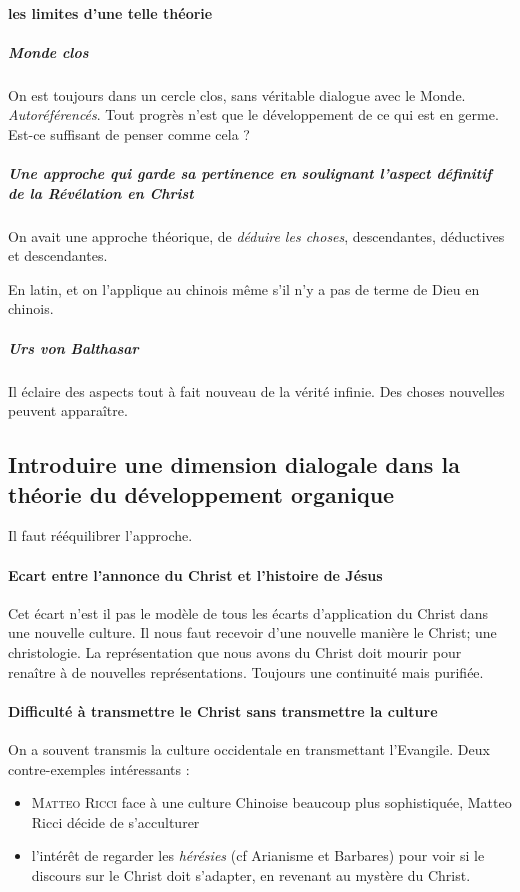     
      
      \paragraph{les limites d'une telle théorie}
      
    \subparagraph{Monde clos}      On est toujours dans un cercle clos, sans véritable dialogue avec le Monde. \textit{Autoréférencés}. Tout progrès n'est que le développement de ce qui est en germe. Est-ce suffisant de penser comme cela ?
    
    \subparagraph{Une approche qui garde sa pertinence en soulignant l'aspect définitif de la Révélation en Christ} On avait une approche théorique, de \textit{déduire les choses}, descendantes, déductives et descendantes. 
    \begin{Ex}
      En latin, et on l'applique au chinois même s'il n'y a pas de terme de Dieu en chinois.
  
    \end{Ex} 
    
    
    \subparagraph{Urs von Balthasar} Il éclaire des aspects tout à fait nouveau de la vérité infinie. Des choses nouvelles peuvent apparaître. 
    
    
    \subsection{Introduire une dimension dialogale dans la théorie du
    développement organique}
    
    Il faut rééquilibrer l'approche.
    \paragraph{Ecart entre l'annonce du Christ et l'histoire de Jésus} Cet écart n'est il pas le modèle de tous les écarts d'application du Christ dans une nouvelle culture. 
    Il nous faut recevoir d'une nouvelle manière le Christ; une christologie. 
    La représentation que nous avons du Christ doit mourir pour renaître à de nouvelles représentations. Toujours une continuité mais purifiée. 
  
  \paragraph{Difficulté à transmettre le Christ sans transmettre la culture} On a souvent transmis la culture occidentale en transmettant l'Evangile. Deux contre-exemples intéressants : 
  \begin{itemize}
      \item \textsc{Matteo Ricci} face à une culture Chinoise beaucoup plus sophistiquée, Matteo Ricci décide de s'acculturer
      \item l'intérêt de regarder les \textit{hérésies} (cf Arianisme et Barbares) pour voir si le discours sur le Christ doit s'adapter, en revenant au mystère du Christ.
  \end{itemize}
  
